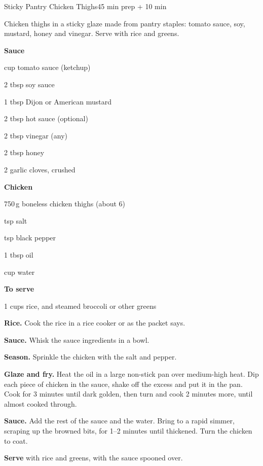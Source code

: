 \begin{recipebox}{Sticky Pantry Chicken Thighs}{4}{5 min prep + 10 min}

Chicken thighs in a sticky glaze made from pantry staples: tomato sauce, soy,
mustard, honey and vinegar. Serve with rice and greens.

\begin{ingredients}
  \item[] \textbf{Sauce}
  \item {} cup tomato sauce (ketchup)
  \item 2 tbsp soy sauce
  \item 1 tbsp Dijon or American mustard
  \item 2 tbsp hot sauce (optional)
  \item 2 tbsp vinegar (any)
  \item 2 tbsp honey
  \item 2 garlic cloves, crushed
  \item[] \textbf{Chicken}
  \item 750\,g boneless chicken thighs (about 6)
  \item {} tsp salt
  \item {} tsp black pepper
  \item 1 tbsp oil
  \item {} cup water
  \item[] \textbf{To serve}
  \item 1 cups rice, and steamed broccoli or other greens
\end{ingredients}

\begin{method}
  \item \textbf{Rice.} Cook the rice in a rice cooker or as the packet says.
  \item \textbf{Sauce.} Whisk the sauce ingredients in a bowl.
  \item \textbf{Season.} Sprinkle the chicken with the salt and pepper.
  \item \textbf{Glaze and fry.} Heat the oil in a large non-stick pan over
        medium-high heat. Dip each piece of chicken in the sauce, shake off the
        excess and put it in the pan. Cook for 3 minutes until dark golden, then
        turn and cook 2 minutes more, until almost cooked through.
  \item \textbf{Sauce.} Add the rest of the sauce and the water. Bring to a rapid
        simmer, scraping up the browned bits, for 1--2 minutes until thickened.
        Turn the chicken to coat.
  \item \textbf{Serve} with rice and greens, with the sauce spooned over.
\end{method}


\end{recipebox}
